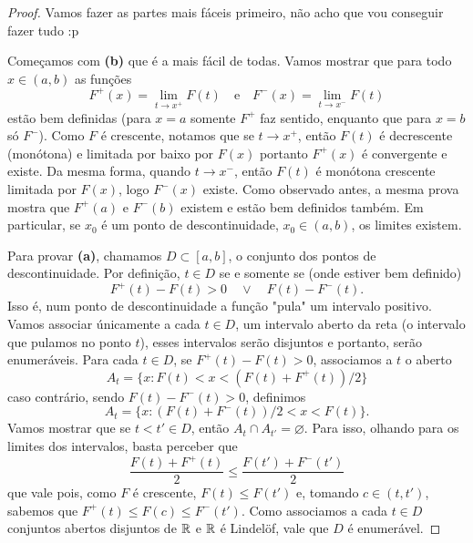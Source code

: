 \begin{proof}
    Vamos fazer as partes mais fáceis primeiro, não acho que vou conseguir fazer tudo  :p

    Começamos com \textbf{(b)} que é a mais fácil de todas. Vamos mostrar que para todo $x \in (a,b)$
    as funções 
    $$F^+(x) = \lim_{t\to x^+} F(t) \quad \text{e}\quad F^-(x) = \lim_{t\to x^-} F(t)$$
    estão bem definidas (para $x = a$ somente $F^+$ faz sentido, enquanto que para $x=b$ só $F^-$). Como $F$ é crescente,
    notamos que se $t\to x^+$, então $F(t)$ é decrescente (monótona) e limitada por baixo por $F(x)$
    portanto $F^+(x)$ é convergente e existe. Da mesma forma, quando $t \to x^-$, então $F(t)$ é monótona crescente limitada por $F(x)$,
    logo $F^-(x)$ existe. Como observado antes, a mesma prova mostra que $F^+(a)$ e $F^-(b)$ existem e estão bem definidos também. 
    Em particular, se $x_0$ é um ponto de descontinuidade, $x_0 \in (a,b)$, os limites existem.

    Para provar \textbf{(a)}, chamamos $D \subset [a,b]$, o conjunto dos pontos de descontinuidade. Por definição, $t \in D$ se e somente se (onde estiver 
    bem definido)
    $$F^+(t) - F(t) > 0 \quad \lor \quad F(t) - F^-(t).$$
    Isso é, num ponto de descontinuidade a função "pula" um intervalo positivo. Vamos associar únicamente a cada $t \in D$, um intervalo aberto da reta 
    (o intervalo que pulamos no ponto $t$), esses intervalos serão disjuntos e portanto, serão enumeráveis.
    Para cada $t \in D$, se $F^+(t) - F(t) > 0$, associamos a $t$ o aberto
    $$A_t = \{x : F(t) < x < (F(t) + F^+(t))/2\}$$
    caso contrário, sendo $F(t) - F^-(t) > 0$, definimos 
    $$A_t = \{x : (F(t) + F^-(t))/2 < x < F(t)\}.$$
    Vamos mostrar que se $t < t' \in D$, então $A_t \cap A_{t'} = \varnothing$. Para isso, olhando para os limites dos intervalos, 
    basta perceber que 
    $$\frac{F(t) + F^+(t)}{2} \leq \frac{F(t') + F^-(t')}{2}$$
    que vale pois, como $F$ é crescente, $F(t) \leq F(t')$ e, tomando $c \in (t,t')$, sabemos que $F^+(t) \leq F(c) \leq F^-(t')$.
    Como associamos a cada $t \in D$ conjuntos abertos disjuntos de $\mathbb{R}$ e $\mathbb{R}$ é Lindelöf, vale que $D$ é enumerável.


\end{proof}
